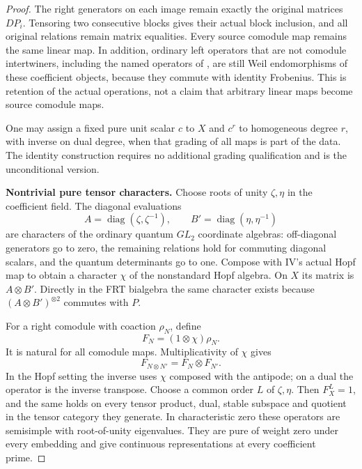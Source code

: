 \begin{proof}
The right generators on each image remain exactly the
original matrices $DP_i$. Tensoring two consecutive blocks
gives their actual block inclusion, and all original
relations remain matrix equalities.
Every source comodule map remains the same linear map.
In addition, ordinary left operators that are not comodule
intertwiners, including the named operators of ,
are still Weil endomorphisms of these coefficient objects,
because they commute with identity Frobenius.
This is retention of the actual operations, not a claim
that arbitrary linear maps become source comodule maps.

One may assign a fixed pure unit scalar $c$ to $X$ and
$c^r$ to homogeneous degree $r$, with inverse on dual
degree, when that grading of all maps is part of the
data. The identity construction requires no additional
grading qualification and is the unconditional version.

\par\smallskip\noindent\textbf{Nontrivial pure tensor characters.}\quad
Choose roots of unity $\zeta,\eta$ in the coefficient field.
The diagonal evaluations
\[
 A=\operatorname{diag}(\zeta,\zeta^{-1}),\qquad
 B'=\operatorname{diag}(\eta,\eta^{-1})
\]
are characters of the ordinary quantum $GL_2$ coordinate
algebras: off-diagonal generators go to zero, the remaining
relations hold for commuting diagonal scalars, and the
quantum determinants go to one. Compose with IV's actual
Hopf map to obtain a character $\chi$ of the nonstandard
Hopf algebra. On $X$ its matrix is $A\otimes B'$.
Directly in the FRT bialgebra the same character exists
because $(A\otimes B')^{\otimes2}$ commutes with $P$.

For a right comodule with coaction $\rho_N$, define
\[
 F_N=(1\otimes\chi)\rho_N.
\]
It is natural for all comodule maps. Multiplicativity of
$\chi$ gives
\[
 F_{N\otimes N'}=F_N\otimes F_{N'}.
\]
In the Hopf setting the inverse uses $\chi$ composed with
the antipode; on a dual the operator is the inverse
transpose. Choose a common order $L$ of $\zeta,\eta$.
Then $F_X^L=1$, and the same holds on every tensor product,
dual, stable subspace and quotient in the tensor category
they generate. In characteristic zero these operators
are semisimple with root-of-unity eigenvalues.
They are pure of weight zero under every embedding and
give continuous representations at every coefficient prime.


\end{proof}
